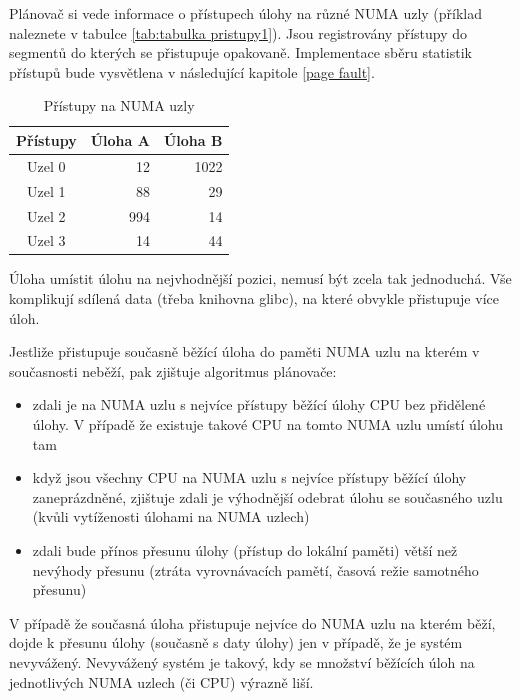 \documentclass[
  master=true,
  font=sans,
  printversion=false,
  joinlists=true,
  figures=true,
  tables=true,
  sourcecodes=false,
  theorems=false,
  bibencoding=utf8,
  language=czech,
  encoding=utf8,
  field=ainfk,
  biblatex,
  glossaries,
  index
]{kidiplom}
\begin{document}
Plánovač si vede informace o přístupech úlohy na různé NUMA uzly (příklad naleznete v tabulce \ref{tab:tabulka pristupy1}). Jsou registrovány přístupy do segmentů do kterých se přistupuje opakovaně. Implementace sběru statistik přístupů bude vysvětlena v následující kapitole \ref{page fault}.

\begin{table}[ht]
\centering
\caption{Přístupy na NUMA uzly}\label{tab:tabulka pristupy1}

\begin{tabular}{|c|r|r|}
\hline
Přístupy & Úloha A & Úloha B \\
\hline
Uzel 0 & 12 & 1022 \\
\hline
Uzel 1 & 88 & 29 \\
\hline
Uzel 2 & 994 & 14 \\
\hline
Uzel 3 & 14 & 44 \\
\hline
\end{tabular}
\label{table1}
\end{table}

Úloha umístit úlohu na nejvhodnější pozici, nemusí být zcela tak jednoduchá. Vše komplikují sdílená data (třeba knihovna glibc), na které obvykle přistupuje více úloh. 
\newpage

Jestliže přistupuje současně běžící úloha do paměti NUMA uzlu na kterém v současnosti neběží, pak zjištuje algoritmus plánovače:
\begin{itemize}
\item zdali je na NUMA uzlu s nejvíce přístupy běžící úlohy CPU bez přidělené úlohy. V případě že existuje takové CPU na tomto NUMA uzlu umístí úlohu tam 
\item když jsou všechny CPU na NUMA uzlu s nejvíce přístupy běžící úlohy zaneprázdněné, zjištuje zdali je výhodnější odebrat úlohu se současného uzlu (kvůli vytíženosti úlohami na NUMA uzlech)
\item zdali bude přínos přesunu úlohy (přístup do lokální paměti) větší než nevýhody přesunu (ztráta vyrovnávacích pamětí, časová režie samotného přesunu) 
\end{itemize}

V případě že současná úloha přistupuje nejvíce do NUMA uzlu na kterém běží, dojde k přesunu úlohy (současně s daty úlohy) jen v případě, že je systém nevyvážený. Nevyvážený systém je takový, kdy se množství běžících úloh na jednotlivých NUMA uzlech (či CPU) výrazně liší.
\end{document}
